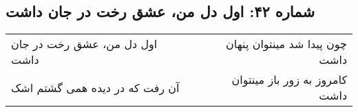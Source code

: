 \begin{center}
\section*{شماره ۴۲: اول دل من، عشق رخت در جان داشت}
\label{sec:042}
\begin{longtable}{l p{0.5cm} r}
اول دل من، عشق رخت در جان داشت
&&
چون پیدا شد مینتوان پنهان داشت
\\
آن رفت که در دیده همی گشتم اشک
&&
کامروز به زور باز مینتوان داشت
\\
\end{longtable}
\end{center}
